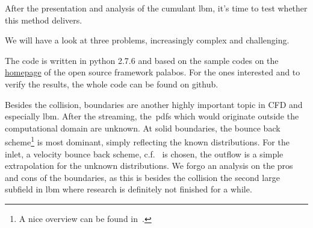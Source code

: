 After the presentation and analysis of the cumulant \gls{lbm}, it's time to test whether this method delivers.

We will have a look at three problems, increasingly complex and challenging.

The code is written in python 2.7.6 and based on the sample codes on the \href{http://wiki.palabos.org/numerics:codes}{homepage} of the open source framework palabos.
For the ones interested and to verify the results, the whole code can be found on github.

Besides the collision, boundaries are another highly important topic in CFD and especially \gls{lbm}.
After the streaming, the~\glspl{pdf} which would originate outside the computational domain are unknown.
At solid boundaries, the bounce back scheme\footnote{A nice overview can be found in~\cite{boundaries}.} is most dominant, simply reflecting the known distributions.
For the inlet, a velocity bounce back scheme, c.f.~\cite{yu2003viscous} is chosen, the outflow is a simple extrapolation for the unknown distributions.
We forgo an analysis on the pros and cons of the boundaries, as this is besides the collision the second large subfield in \gls{lbm} where research is definitely not finished for a while.
